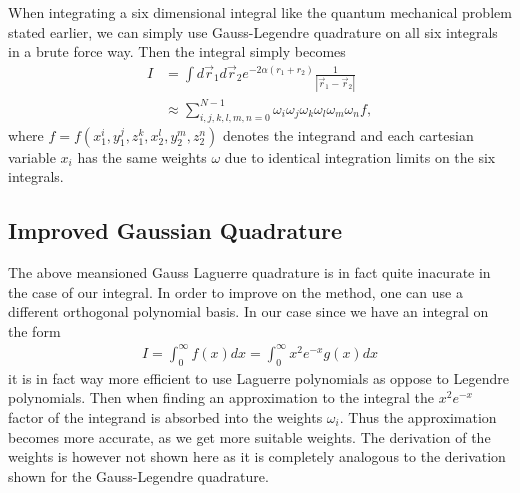 \documentclass[twocolumn]{aastex62}
\begin{document}
When integrating a six dimensional integral like the quantum mechanical problem
stated earlier, we can simply use Gauss-Legendre quadrature on all six integrals
in a brute force way. Then the integral simply becomes 
\begin{align}
	I &= \int d\vec{r}_1d\vec{r}_2 e^{-2\alpha(r_1 + r_2)}\frac{1}{|\vec{r}_1 - \vec{r}_2|} \\
	&\approx \sum_{i, j, k, l, m, n = 0}^{N-1} \omega_i \omega_j \omega_k \omega_l \omega_m \omega_n f,
\end{align} 
where $f = f(x_1^i, y_1^j, z_1^k, x_2^l, y_2^m, z_2^n)$ denotes the integrand
and each cartesian variable $x_i$ has the same weights $\omega$ due to identical
integration limits on the six integrals. 

\subsection{Improved Gaussian Quadrature}\label{subsec:improved_gauss}
The above meansioned Gauss Laguerre quadrature is in fact quite inacurate in the
case of our integral. In order to improve on the method, one can use a different
orthogonal polynomial basis. In our case since we have an integral on the form
\begin{align}
	I = \int^\infty_0 f(x)dx = \int^\infty_0x^2e^{-x}g(x) dx
	\label{eq:laguerre_integral}
\end{align}
it is in fact way more efficient to use Laguerre polynomials as oppose to
Legendre polynomials. Then when finding an approximation to the integral the
$x^2e^{-x}$ factor of the integrand is absorbed into the weights $\omega_i$.
Thus the approximation becomes more accurate, as we get more suitable weights.
The derivation of the weights is however not shown here as it is completely
analogous to the derivation shown for the Gauss-Legendre quadrature.
\end{document}
